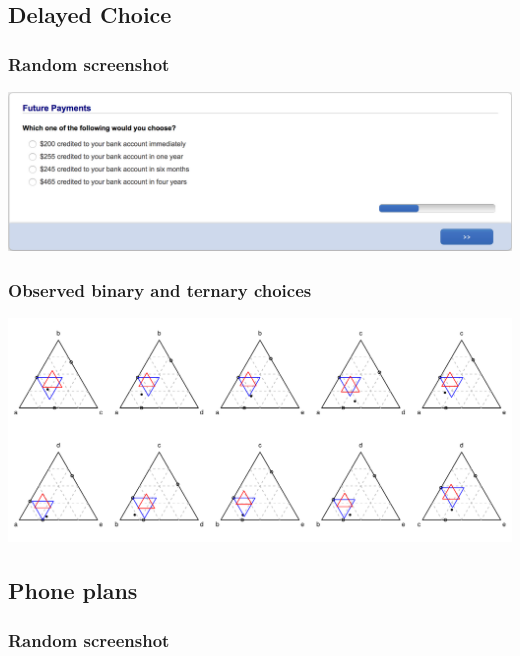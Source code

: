 \documentclass[11pt,letter]{article}
\begin{document}
\pagebreak

\subsection*{Delayed Choice}



\subsubsection*{Random screenshot}

\includegraphics[width=15cm]{Population_study_design/screenshot_delayed_choice.png}

\subsubsection*{Observed binary and ternary choices}

\includegraphics[width=15cm]{./Population_study_data/Simplexes/delayed_choice.pdf}

\pagebreak

\subsection*{Phone plans}



\subsubsection*{Random screenshot}
\end{document}
